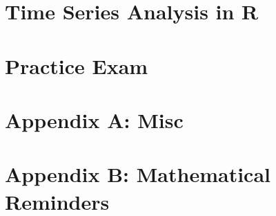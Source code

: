 \documentclass[11pt]{article}
\begin{document}
\newpage
\section{Time Series Analysis in R}


\newpage
\section{Practice Exam}


\newpage
\section{Appendix A: Misc}



\newpage
\section{Appendix B: Mathematical Reminders}

\end{document}
